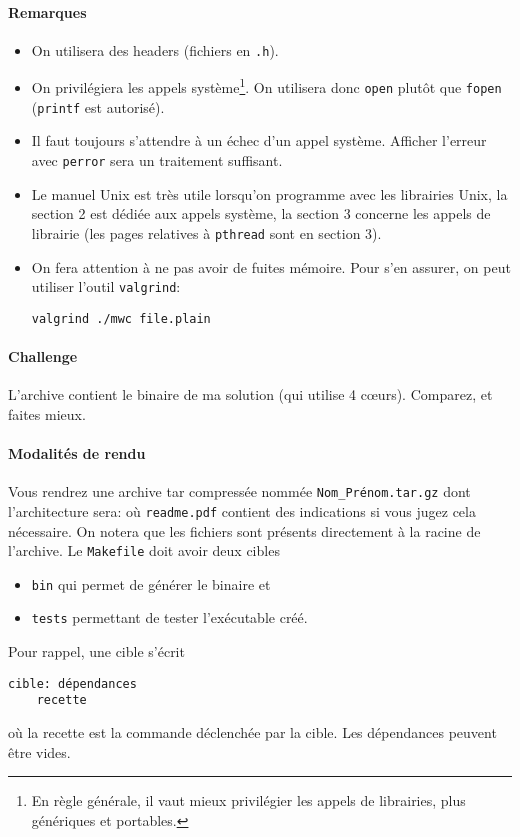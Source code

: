 \documentclass{exam}
\begin{document}
\paragraph{Remarques}
\begin{itemize}
  \item On utilisera des headers (fichiers en \texttt{.h}).
  \item On privilégiera les appels système\footnote{En règle générale, il vaut
    mieux privilégier les appels de librairies, plus génériques et portables.}.
    On utilisera donc \texttt{open} plutôt que \texttt{fopen} (\texttt{printf}
    est autorisé).
  \item Il faut toujours s'attendre à un échec d'un appel système. Afficher
    l'erreur avec \texttt{perror} sera un traitement suffisant.
  \item Le manuel Unix est très utile lorsqu'on programme avec les librairies
    Unix, la section 2 est dédiée aux appels système, la section 3 concerne les
    appels de librairie (les pages relatives à \texttt{pthread} sont en section
    3).
  \item On fera attention à ne pas avoir de fuites mémoire. Pour s'en assurer,
    on peut utiliser l'outil \texttt{valgrind}:
\begin{verbatim}
valgrind ./mwc file.plain
\end{verbatim}
\end{itemize}

\paragraph{Challenge}
L'archive contient le binaire de ma solution (qui utilise 4
c\oe{}urs). Comparez, et faites mieux.

\paragraph{Modalités de rendu}
Vous rendrez une archive tar compressée nommée \texttt{Nom\_Prénom.tar.gz}
dont l'architecture sera:
où \texttt{readme.pdf} contient des indications si vous jugez cela nécessaire.
On notera que les fichiers sont présents directement à la racine de l'archive.
Le \texttt{Makefile} doit avoir deux cibles
\begin{itemize}
  \item \texttt{bin} qui permet de générer le binaire et
  \item \texttt{tests} permettant de tester l'exécutable créé.
\end{itemize}
Pour rappel, une cible s'écrit
\begin{verbatim}
cible: dépendances
	recette
\end{verbatim}
o\`u la recette est la commande déclenchée par la cible. Les dépendances peuvent
être vides.
\end{document}
